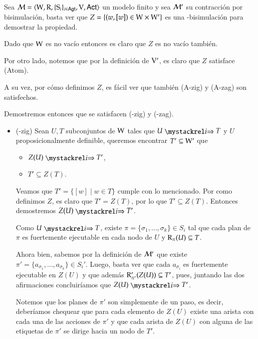 \begin{demostracion}
    Sea $\mathcal{M}=\langle \mathrm{W},\mathrm{R},\{ \mathrm{S}_i \}_{i \in {\rm \sf Agt}},\mathrm{V},{\rm \sf Act} \rangle$ un modelo finito
    y sea $\mathcal{M}'$ su contracción por bisimulación, basta ver que $Z = \{(w,[w]) \in \mathrm{W} \times\mathrm{W}'\}$ es una \KHilogic-bisimulación para demostrar la propiedad.

    Dado que $\mathrm{W}$ es no vacío entonces es claro que $Z$ es no vacío también.

    Por otro lado, notemos que por la definición de $\mathrm{V}'$, es claro que $Z$ satisface (Atom).

    A su vez, por cómo definimos $Z$, es fácil ver que también (A-zig) y (A-zag) son satisfechos.
    
    Demostremos entonces que se satisfacen (\KHilogic-zig) y (\KHilogic-zag).

    \begin{itemize}
        \item (\KHilogic-zig) Sean $U, T$ subconjuntos de $\mathrm{W}$ tales que $U \ultsExecAgi T$ y $U$ proposicionalmente definible, queremos encontrar $T' \subseteq \mathrm{W}'$ que

        \begin{multicols}{2}
            \begin{itemize}
                \item $Z(U) \ultsExecAgi T'$, 
                \item $T' \subseteq Z(T)$.
            \end{itemize}
        \end{multicols}

        Veamos que $T' = \{ [w] \mid w \in T\}$ cumple con lo mencionado. Por como definimos $Z$, es claro que $T'  = Z(T)$, por lo que $T' \subseteq Z(T)$. Entonces demostremos $Z(U) \ultsExecAgi T'$.


        Como $U \ultsExecAgi T$, existe $\pi = \{\sigma_1,...,\sigma_k\} \in S_i$ tal que cada plan de $\pi$ es fuertemente ejecutable en cada nodo de $U$ y $\mathrm{R}_\pi(U) \subseteq T$. 

        Ahora bien, sabemos por la definición de $\mathcal{M}'$ que existe $\pi' =\{a_{\sigma_1},...,a_{\sigma_k}\} \in S_i'$. Luego, basta ver que cada $a_{\sigma_i}$ es fuertemente ejecutable en $Z(U)$ y que además $\mathrm{R}'_{\pi'}(Z(U)) \subseteq T'$, pues, juntando las dos afirmaciones concluiríamos que $Z(U) \ultsExecAgi T'$.


        Notemos que los planes de $\pi'$ son simplemente de un paso, es decir, deberíamos chequear que para cada elemento de $Z(U)$ existe una arista con cada una de las acciones de $\pi'$ y que cada arista de $Z(U)$ con alguna de las etiquetas de $\pi'$ se dirige hacia un nodo de $T'$. 


\end{itemize}
\end{demostracion}
